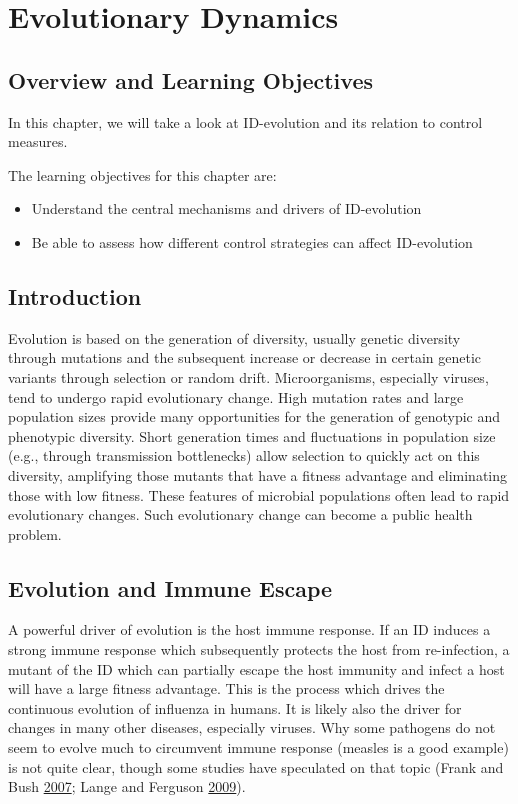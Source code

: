 \documentclass[]{book}
\providecommand{\tightlist}{%
  \setlength{\itemsep}{0pt}\setlength{\parskip}{0pt}}
\theoremstyle{definition}
\theoremstyle{definition}
\theoremstyle{definition}
\theoremstyle{remark}
\begin{document}
\chapter{Evolutionary Dynamics}\label{evolutionary-dynamics}

\section{Overview and Learning
Objectives}\label{overview-and-learning-objectives-13}

In this chapter, we will take a look at ID-evolution and its relation to
control measures.

The learning objectives for this chapter are:

\begin{itemize}
\tightlist
\item
  Understand the central mechanisms and drivers of ID-evolution
\item
  Be able to assess how different control strategies can affect
  ID-evolution
\end{itemize}

\section{Introduction}\label{introduction-12}

Evolution is based on the generation of diversity, usually genetic
diversity through mutations and the subsequent increase or decrease in
certain genetic variants through selection or random drift.
Microorganisms, especially viruses, tend to undergo rapid evolutionary
change. High mutation rates and large population sizes provide many
opportunities for the generation of genotypic and phenotypic diversity.
Short generation times and fluctuations in population size (e.g.,
through transmission bottlenecks) allow selection to quickly act on this
diversity, amplifying those mutants that have a fitness advantage and
eliminating those with low fitness. These features of microbial
populations often lead to rapid evolutionary changes. Such evolutionary
change can become a public health problem.

\section{Evolution and Immune Escape}\label{evolution-and-immune-escape}

A powerful driver of evolution is the host immune response. If an ID
induces a strong immune response which subsequently protects the host
from re-infection, a mutant of the ID which can partially escape the
host immunity and infect a host will have a large fitness advantage.
This is the process which drives the continuous evolution of influenza
in humans. It is likely also the driver for changes in many other
diseases, especially viruses. Why some pathogens do not seem to evolve
much to circumvent immune response (measles is a good example) is not
quite clear, though some studies have speculated on that topic (Frank
and Bush \protect\hyperlink{ref-frank07}{2007}; Lange and Ferguson
\protect\hyperlink{ref-lange09}{2009}).
\end{document}
